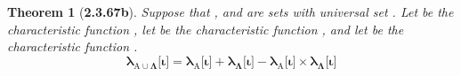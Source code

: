 \documentclass[a4paper, 12pt]{article}
\theoremstyle{plain}
\newtheorem*{theorem*}{Theorem}
\begin{document}
\begin{theorem*}[\textbf{2.3.67b}]
    Suppose that , and \bm{$\Lambda$} are sets with universal set \bm{$\Omega$}. 
    Let  be the characteristic function 
    ,
    let  be the characteristic function 
    ,
    and let \bm{$\lambda_{\Lambda}$} be the characteristic function 
    .
    \begin{equation*}
        \bm{
            \lambda_{\mathrm{A} \cup \Lambda} \big[ \iota \big] 
                = 
            \lambda_{\mathrm{A}} \big[ \iota \big] 
                + 
            \lambda_{\Lambda} \big[ \iota \big] 
                - 
            \lambda_{\mathrm{A}} \big[ \iota \big]
                \times 
            \lambda_{\Lambda} \big[ \iota \big]
        }
    \end{equation*}
\end{theorem*}
\end{document}
